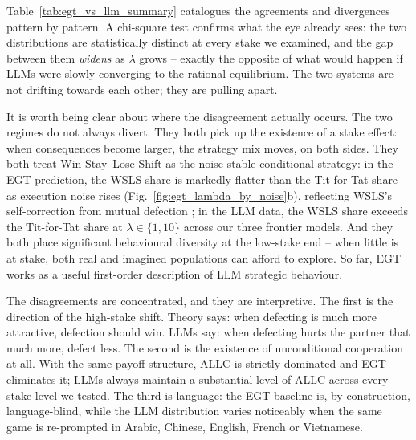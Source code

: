 \documentclass[a4paper,fleqn]{cas-sc}
\begin{document}
Table~\ref{tab:egt_vs_llm_summary} catalogues the agreements and divergences pattern by pattern. A chi-square test confirms what the eye already sees: the two distributions are statistically distinct at every stake we examined, and the gap between them \emph{widens} as $\lambda$ grows -- exactly the opposite of what would happen if LLMs were slowly converging to the rational equilibrium. The two systems are not drifting towards each other; they are pulling apart.

It is worth being clear about where the disagreement actually occurs. The two regimes do not always divert. They both pick up the existence of a stake effect: when consequences become larger, the strategy mix moves, on both sides. They both treat Win-Stay--Lose-Shift as the noise-stable conditional strategy: in the EGT prediction, the WSLS share is markedly flatter than the Tit-for-Tat share as execution noise rises (Fig.~\ref{fig:egt_lambda_by_noise}b), reflecting WSLS's self-correction from mutual defection \cite{imhof2007tit,han2011intention}; in the LLM data, the WSLS share exceeds the Tit-for-Tat share at $\lambda \in \{1, 10\}$ across our three frontier models. And they both place significant behavioural diversity at the low-stake end -- when little is at stake, both real and imagined populations can afford to explore. So far, EGT works as a useful first-order description of LLM strategic behaviour.

The disagreements are concentrated, and they are interpretive. The first is the direction of the high-stake shift. Theory says: when defecting is much more attractive, defection should win. LLMs say: when defecting hurts the partner that much more, defect less. The second is the existence of unconditional cooperation at all. With the same payoff structure, ALLC is strictly dominated and EGT eliminates it; LLMs always maintain a substantial level of ALLC across every stake level we tested. The third is language: the EGT baseline is, by construction, language-blind, while the LLM distribution varies  noticeably when the same game is re-prompted in Arabic, Chinese, English, French or Vietnamese.
\end{document}
